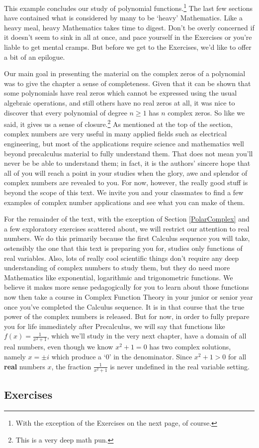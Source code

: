 \documentclass{ximera}
\begin{document}
This example concludes our study of polynomial functions.\footnote{With the exception of the Exercises on the next page, of course.}  The last few sections have contained what is considered by many to be `heavy' Mathematics.  Like a heavy meal, heavy Mathematics takes time to digest.  Don't be overly concerned if it doesn't seem to sink in all at once, and pace yourself in the Exercises or you're liable to get mental cramps.  But before we get to the Exercises, we'd like to offer a bit of an epilogue.  

\medskip

\label{complexepilogue}

Our main goal in presenting the material on the complex zeros of a polynomial was to give the chapter a sense of completeness.  Given that it can be shown that some polynomials have real zeros which cannot be expressed using the usual algebraic operations, and still others have no real zeros at all, it was nice to discover that every polynomial of degree $n \geq 1$ has $n$ complex zeros.  So like we said, it gives us a sense of closure.\footnote{This is a very deep math pun.}  As mentioned at the top of the section, complex numbers are very useful in many applied fields such as electrical engineering,  but most of the applications require science and mathematics well beyond precalculus material to fully understand them.  That does not mean you'll never be be able to understand them; in fact, it is the authors' sincere hope that all of you will reach a point in your studies when the glory, awe and splendor of complex numbers are revealed to you.  For now, however, the really good stuff is beyond the scope of this text. We invite you and your classmates to find a few examples of complex number applications and see what you can make of them. 

\medskip

For the remainder of the text, with the exception of Section \ref{PolarComplex} and a few exploratory exercises scattered about, we will restrict our attention to real numbers.  We do this primarily because the first Calculus sequence you will take, ostensibly the one that this text is preparing you for, studies only functions of real variables.  Also, lots of really cool scientific things don't require any deep understanding of complex numbers to study them, but they do need more Mathematics like exponential, logarithmic and trigonometric functions.  We believe it makes more sense pedagogically for you to learn about those functions now then take a course in Complex Function Theory in your junior or senior year once you've completed the Calculus sequence.  It is in that course that the true power of the complex numbers is released.  But for now, in order to fully prepare you for life immediately after Precalculus, we will say that functions like $f(x) = \frac{1}{x^{2} + 1}$, which we'll study in the very next chapter,  have a domain of all real numbers, even though we know $x^{2} + 1 = 0$ has two complex solutions, namely $x = \pm i$ which produce a `$0$' in the denominator.  Since $x^{2} + 1 > 0$ for all \textbf{real} numbers $x$, the fraction $\frac{1}{x^{2} + 1}$ is never undefined in the real variable setting.

\newpage

\subsection{Exercises}



\closegraphsfile
\end{document}

